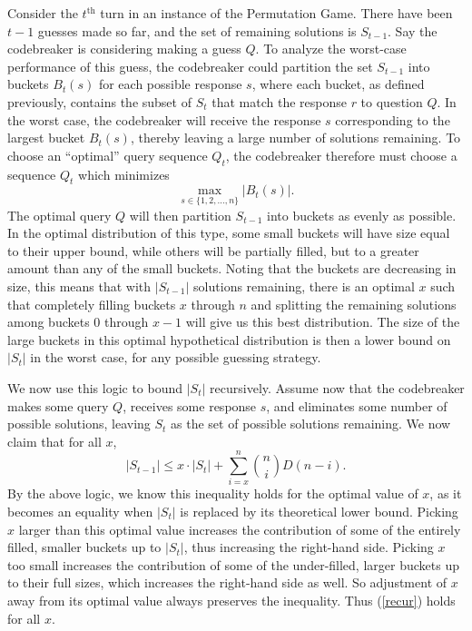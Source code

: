 \documentclass[12pt, a4paper]{article}
\newcommand{\nth}{^{\text{th}}}       %
\begin{document}
		 Consider the $t\nth$ turn in an instance of the Permutation Game. There have been $t-1$ guesses made so far, and the set of remaining solutions is $S_{t-1}$. Say the codebreaker is considering making a guess $Q$. To analyze the worst-case performance of this guess, the codebreaker could partition the set $S_{t-1}$ into buckets $ B_{t}(s)$ for each possible response $s$, where each bucket, as defined previously, contains the subset of $S_t$ that match the response $r$ to question $Q$. In the worst case, the codebreaker will receive the response $s$ corresponding to the largest bucket $B_t(s)$, thereby leaving a large number of solutions remaining. To choose an ``optimal'' query sequence $Q_t$, the codebreaker therefore must choose a sequence $Q_t$ which minimizes
		 \begin{equation*}
			\max_{s\in\{1,2,\ldots,n\}}|B_{t}(s)|.
		 \end{equation*}
		 The optimal query $Q$ will then partition $S_{t-1}$ into buckets as evenly as possible. In the optimal distribution of this type, some small buckets will have size equal to their upper bound, while others will be partially filled, but to a greater amount than any of the small buckets. Noting that the buckets are decreasing in size, this means that with $|S_{t-1}|$ solutions remaining, there is an optimal $x$ such that completely filling buckets $x$ through $n$ and splitting the remaining solutions among buckets 0 through $x-1$ will give us this best distribution. The size of the large buckets in this optimal hypothetical distribution is then a lower bound on $|S_t|$ in the worst case, for any possible guessing strategy.
		 
		We now use this logic to bound $|S_t|$ recursively. Assume now that the codebreaker makes some query $Q$, receives some response $s$, and eliminates some number of possible solutions, leaving $S_t$ as the set of possible solutions remaining. We now claim that for all $x$,
		\begin{equation*}
			|S_{t-1}|\le  x\cdot |S_t| + \sum_{i = x}^{n}\binom{n}{i}D(n-i).
		\end{equation*}
		By the above logic, we know this inequality holds for the optimal value of $x$, as it becomes an equality when $|S_t|$ is replaced by its theoretical lower bound. Picking $x$ larger than this optimal value increases the contribution of some of the entirely filled, smaller buckets up to $|S_t|$, thus increasing the right-hand side. Picking $x$ too small increases the contribution of some of the under-filled, larger buckets up to their full sizes, which increases the right-hand side as well. So adjustment of $x$ away from its optimal value always preserves the inequality. Thus (\ref{recur}) holds for all $x$.
		
\end{document}

